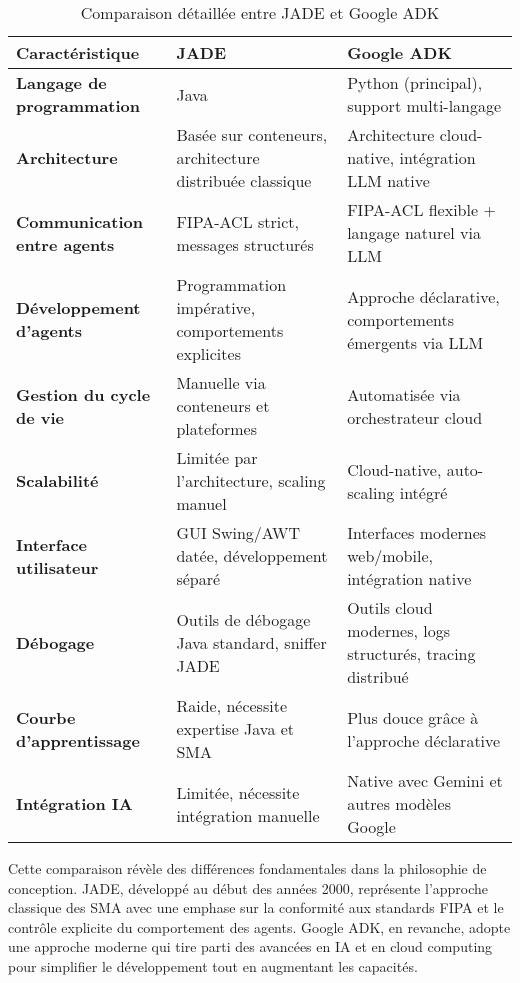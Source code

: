 \begin{table}[h]
\centering
\begin{tabular}{|p{4cm}|p{5.5cm}|p{5.5cm}|}
\hline
\textbf{Caractéristique} & \textbf{JADE} & \textbf{Google ADK} \\
\hline
\textbf{Langage de programmation} & Java & Python (principal), support multi-langage \\
\hline
\textbf{Architecture} & Basée sur conteneurs, architecture distribuée classique & Architecture cloud-native, intégration LLM native \\
\hline
\textbf{Communication entre agents} & FIPA-ACL strict, messages structurés & FIPA-ACL flexible + langage naturel via LLM \\
\hline
\textbf{Développement d'agents} & Programmation impérative, comportements explicites & Approche déclarative, comportements émergents via LLM \\
\hline
\textbf{Gestion du cycle de vie} & Manuelle via conteneurs et plateformes & Automatisée via orchestrateur cloud \\
\hline
\textbf{Scalabilité} & Limitée par l'architecture, scaling manuel & Cloud-native, auto-scaling intégré \\
\hline
\textbf{Interface utilisateur} & GUI Swing/AWT datée, développement séparé & Interfaces modernes web/mobile, intégration native \\
\hline
\textbf{Débogage} & Outils de débogage Java standard, sniffer JADE & Outils cloud modernes, logs structurés, tracing distribué \\
\hline
\textbf{Courbe d'apprentissage} & Raide, nécessite expertise Java et SMA & Plus douce grâce à l'approche déclarative \\
\hline
\textbf{Intégration IA} & Limitée, nécessite intégration manuelle & Native avec Gemini et autres modèles Google \\
\hline
\end{tabular}
\caption{Comparaison détaillée entre JADE et Google ADK}
\end{table}

Cette comparaison révèle des différences fondamentales dans la philosophie de conception. JADE, développé au début des années 2000, représente l'approche classique des SMA avec une emphase sur la conformité aux standards FIPA et le contrôle explicite du comportement des agents. Google ADK, en revanche, adopte une approche moderne qui tire parti des avancées en IA et en cloud computing pour simplifier le développement tout en augmentant les capacités.

